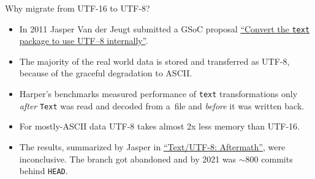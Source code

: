 \documentclass[handout]{beamer}
\begin{document}
\begin{frame}[fragile]{Why migrate from UTF-16 to UTF-8?}

\begin{itemize}[<+->]
\item In 2011 Jasper Van der Jeugt submitted a GSoC proposal
      \href{https://jaspervdj.be/files/2011-gsoc-text-utf8-proposal.html}{``Convert the {\tt text} package to use UTF–8 internally''}.
\item The majority of the real world data is stored and transferred as UTF-8,
      because of the graceful degradation to ASCII.
\item Harper's benchmarks measured performance of {\tt text} transformations only
      {\em after} {\tt Text} was read and decoded from a~file
      and {\em before} it was written back.
\item For mostly-ASCII data UTF-8 takes almost 2x less memory than UTF-16.
\item The results, summarized by Jasper in
      \href{https://jaspervdj.be/posts/2011-08-19-text-utf8-the-aftermath.html}{``Text/UTF-8: Aftermath''},
      were inconclusive. The branch got abandoned and by 2021
      was $\sim800$ commits behind {\tt HEAD}.
\end{itemize}
\end{frame}

\long{}
\end{document}

